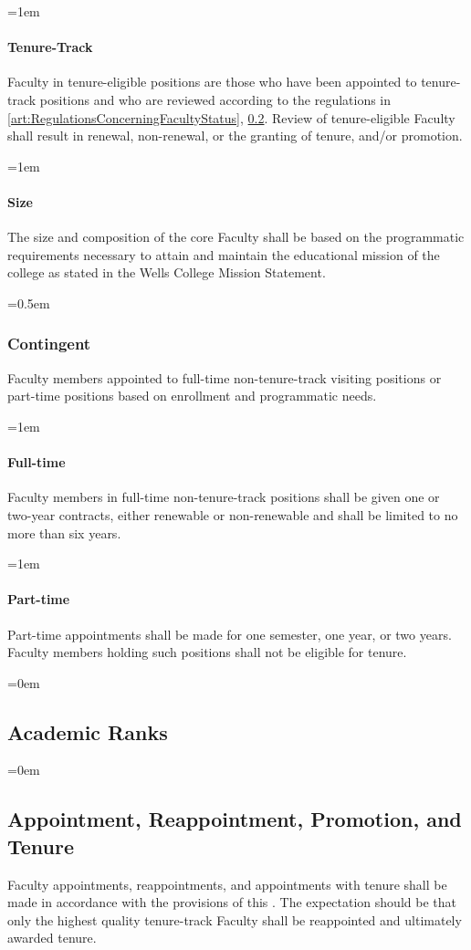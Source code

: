 \documentclass{manual}
\let\oldsubsection\subsection
\renewcommand\subsection{\leftskip=0em\oldsubsection}
\let\oldsubsubsection\subsubsection
\renewcommand\subsubsection{\leftskip=0.5em\oldsubsubsection}
\let\oldparagraph\paragraph
\renewcommand\paragraph{\leftskip=1em\oldparagraph}
\begin{document}
\paragraph{Tenure-Track} 
Faculty in tenure-eligible positions are those who have been appointed to tenure-track positions and who are reviewed according to the regulations in \cref{art:RegulationsConcerningFacultyStatus}, \cref{sec:AppointmentReappointmentPromotionAndTenure}. Review of tenure-eligible Faculty shall result in renewal, non-renewal, or the granting of tenure, and/or promotion.

\paragraph{Size} 
The size and composition of the core Faculty shall be based on the programmatic requirements necessary to attain and maintain the educational mission of the college as stated in the Wells College Mission Statement.

\subsubsection{Contingent}
Faculty members appointed to full-time non-tenure-track visiting positions or part-time positions based on enrollment and programmatic needs.

\paragraph{Full-time} 
Faculty members in full-time non-tenure-track positions shall be given one or two-year contracts, either renewable or non-renewable and shall be limited to no more than six years.

\paragraph{Part-time} 
Part-time appointments shall be made for one semester, one year, or two years. Faculty members holding such positions shall not be eligible for tenure.

\subsection{Academic Ranks}


\subsection{Appointment, Reappointment, Promotion, and Tenure}\label{sec:AppointmentReappointmentPromotionAndTenure}
Faculty appointments, reappointments, and appointments with tenure shall be made in accordance with the provisions of this . The expectation should be that only the highest quality tenure-track Faculty shall be reappointed and ultimately awarded tenure.
\end{document}
